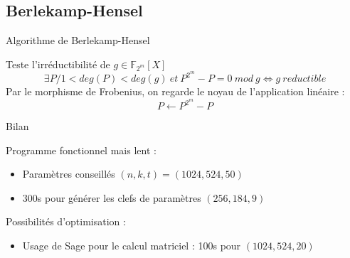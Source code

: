\documentclass{beamer}
\begin{document}
		\subsection{Berlekamp-Hensel}

			\begin{frame}{Algorithme de Berlekamp-Hensel}

				Teste l'irréductibilité de $ g \in \mathbb{F}_{2^{m}}[X] $
				$$
					\exists P / 1<deg(P)<deg(g) \ et \ P^{2^{m}} - P = 0 \ mod \ g \Leftrightarrow g \ reductible
				$$
				Par le morphisme de Frobenius, on regarde le noyau de l'application linéaire :
				$$
					P \leftarrow P^{2^{m}} - P
				$$
				
			\end{frame}



		\begin{frame}{Bilan}
			
			Programme fonctionnel mais lent :
			\begin{itemize}
				\item Paramètres conseillés $ (n,k,t) = (1024,524,50) $
				\item 300s pour générer les clefs de paramètres $ (256 ,184 ,9 ) $
			\end{itemize}

			Possibilités d'optimisation :
			\begin{itemize}
				\item Usage de Sage pour le calcul matriciel : 100s pour $(1024,524,20)$
				
			\end{itemize}


		\end{frame}
		
	    
\end{document}
